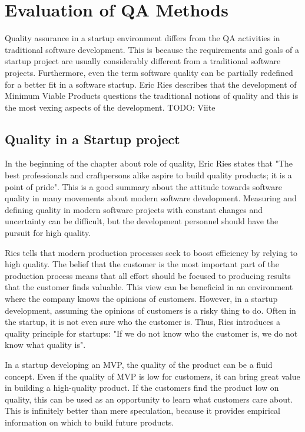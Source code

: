 
 \section{Evaluation of QA Methods}

Quality assurance in a startup environment differs from the QA activities in traditional software development. This is because the requirements and goals of a startup project are usually considerably different from a traditional software projects. Furthermore, even the term software quality can be partially redefined for a better fit in a software startup. Eric Ries describes that the development of Minimum Viable Products questions the traditional notions of quality and this is the most vexing aspects of the development. TODO: Viite


 \subsection{Quality in a Startup project}

In the beginning of the chapter about role of quality, Eric Ries states that "The best professionals and craftpersons alike aspire to build quality products; it is a point of pride". This is a good summary about the attitude towards software quality in many movements about modern software development. Measuring and defining quality in modern software projects with constant changes and uncertainty can be difficult, but the development personnel should have the pursuit for high quality.

Ries tells that modern production processes seek to boost efficiency by relying to high quality. The belief that the customer is the most important part of the production process means that all effort should be focused to producing results that the customer finds valuable. This view can be beneficial in an environment where the company knows the opinions of customers. However, in a startup development, assuming the opinions of customers is a risky thing to do. Often in the startup, it is not even sure who the customer is. Thus, Ries introduces a quality principle for startups: "If we do not know who the customer is, we do not know what quality is".

In a startup developing an MVP, the quality of the product can be a fluid concept. Even if the quality of MVP is low for customers, it can bring great value in building a high-quality product. If the customers find the product low on quality, this can be used as an opportunity to learn what customers care about. This is infinitely better than mere speculation, because it provides empirical information on which to build future products.

